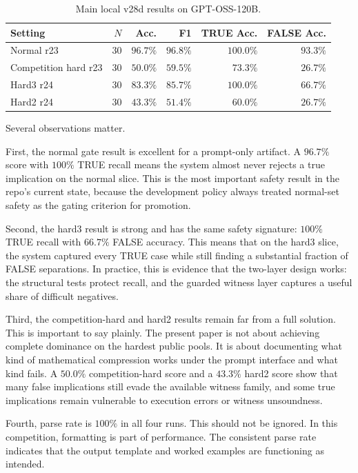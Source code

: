 \documentclass[12pt]{amsart}
\begin{document}
\begin{table}[t]
\centering
\caption{Main local v28d results on GPT-OSS-120B.}
\begin{tabular}{>{\raggedright\arraybackslash}p{1.7in} r r r r r}
\toprule
Setting & $N$ & Acc. & F1 & TRUE Acc. & FALSE Acc. \\
\midrule
Normal r23 & 30 & $96.7\%$ & $96.8\%$ & $100.0\%$ & $93.3\%$ \\
Competition hard r23 & 30 & $50.0\%$ & $59.5\%$ & $73.3\%$ & $26.7\%$ \\
Hard3 r24 & 30 & $83.3\%$ & $85.7\%$ & $100.0\%$ & $66.7\%$ \\
Hard2 r24 & 30 & $43.3\%$ & $51.4\%$ & $60.0\%$ & $26.7\%$ \\
\bottomrule
\end{tabular}
\end{table}

Several observations matter.

First, the normal gate result is excellent for a prompt-only artifact. A $96.7\%$ score with $100\%$ TRUE recall means the system almost never rejects a true implication on the normal slice. This is the most important safety result in the repo's current state, because the development policy always treated normal-set safety as the gating criterion for promotion.

Second, the hard3 result is strong and has the same safety signature: $100\%$ TRUE recall with $66.7\%$ FALSE accuracy. This means that on the hard3 slice, the system captured every TRUE case while still finding a substantial fraction of FALSE separations. In practice, this is evidence that the two-layer design works: the structural tests protect recall, and the guarded witness layer captures a useful share of difficult negatives.

Third, the competition-hard and hard2 results remain far from a full solution. This is important to say plainly. The present paper is not about achieving complete dominance on the hardest public pools. It is about documenting what kind of mathematical compression works under the prompt interface and what kind fails. A $50.0\%$ competition-hard score and a $43.3\%$ hard2 score show that many false implications still evade the available witness family, and some true implications remain vulnerable to execution errors or witness unsoundness.

Fourth, parse rate is $100\%$ in all four runs. This should not be ignored. In this competition, formatting is part of performance. The consistent parse rate indicates that the output template and worked examples are functioning as intended.
\end{document}
